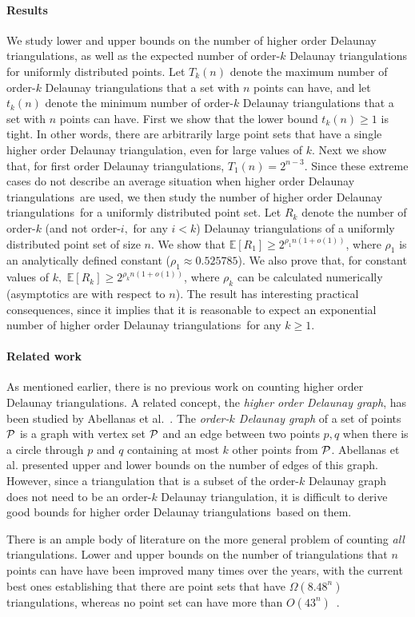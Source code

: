 \documentclass {journal}
\newcommand{\maxno}[1]{\ensuremath{T_{#1}(n)}}
\newcommand{\minno}[1]{\ensuremath{t_{#1}(n)}}
\newcommand{\maxnok}{\maxno{k}}
\newcommand{\minnok}{\minno{k}}
\newcommand{\Pts}{\cal P}
\newcommand {\hodt}{higher order Delaunay triangulation}
\newcommand {\hodts}{higher order Delaunay triangulations}
\newcommand {\fodts}{first order Delaunay triangulations}
\newcommand{\bE}{{\mathbb E}}
\begin{document}
\paragraph{Results} We study lower and upper bounds on the number of \hodts, as well
as the expected number of order-$k$ Delaunay triangulations for
uniformly distributed points. Let $\maxnok$ denote the maximum
number of order-$k$ Delaunay triangulations that a set with $n$
points can have, and let $\minnok$ denote the minimum number of
order-$k$ Delaunay triangulations that a set with $n$ points can
have. First we show that the lower bound $ \minno{k} \geq 1$ is
tight. In other words, there are arbitrarily large point sets that
have a single \hodt, even for large values of $k$. Next we show
that, for \fodts, $\maxno{1} = 2^{n-3}$. Since these extreme cases
do not describe an average situation when \hodts\ are used, we
then study the number of \hodts\ for a uniformly distributed point
set. Let $R_k$ denote the number of order-$k$ (and not order-$i,$
for any $i < k$) Delaunay triangulations of a uniformly
distributed point set of size $n$. We show that $\bE[R_1]\geq
2^{\rho_1 n(1+o(1))}$, where $\rho_1$ is an analytically defined
constant ($\rho_1 \approx 0.525785$). We also prove that, for
constant values of $k,$ $\bE[R_k]\geq 2^{\rho_k n (1+o(1))}$,
where $\rho_k$ can be calculated numerically (asymptotics are with
respect to $n$). The result has interesting practical
consequences, since it implies that it is reasonable to expect an
exponential number of \hodts\ for any $k \geq 1$.


\paragraph{Related work}
As mentioned earlier, there is no previous work on counting \hodts.
A related concept, the \emph{higher order Delaunay graph}, has been studied by Abellanas et al.~\cite{apgh-sgtph-08}.
The \emph{order-$k$ Delaunay graph} of a set of points $\Pts$ is a graph with vertex set $\Pts$ and an edge between two points $p,q$ when there is a circle through $p$ and $q$ containing at most $k$ other points from $\Pts$.
Abellanas et al. presented upper and lower bounds on the number of edges of this graph. However, since a triangulation that is a subset of the order-$k$ Delaunay graph does not need to be an order-$k$ Delaunay triangulation, it is difficult to derive good bounds for \hodts\ based on them.

There is an ample body of literature on the more general problem of counting \emph{all} triangulations.
Lower and upper bounds on the number of triangulations that $n$ points can have have been improved many times over the years, with the current best ones establishing that there are point sets that have $\Omega(8.48^n)$~\cite{ahhhk-npg-06} triangulations, whereas no point set can have more than $O(43^n)$~\cite{sw-rtpps-06}.
\end{document}
